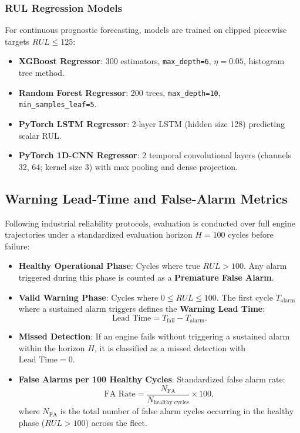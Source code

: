 \subsubsection{RUL Regression Models}
For continuous prognostic forecasting, models are trained on clipped piecewise targets $RUL \le 125$:
\begin{itemize}
    \item \textbf{XGBoost Regressor}: 300 estimators, \texttt{max\_depth=6}, $\eta=0.05$, histogram tree method.
    \item \textbf{Random Forest Regressor}: 200 trees, \texttt{max\_depth=10}, \texttt{min\_samples\_leaf=5}.
    \item \textbf{PyTorch LSTM Regressor}: 2-layer LSTM (hidden size 128) predicting scalar RUL.
    \item \textbf{PyTorch 1D-CNN Regressor}: 2 temporal convolutional layers (channels 32, 64; kernel size 3) with max pooling and dense projection.
\end{itemize}

\subsection{Warning Lead-Time and False-Alarm Metrics}
Following industrial reliability protocols, evaluation is conducted over full engine trajectories under a standardized evaluation horizon $H=100$ cycles before failure:
\begin{itemize}
    \item \textbf{Healthy Operational Phase}: Cycles where true $RUL > 100$. Any alarm triggered during this phase is counted as a \textbf{Premature False Alarm}.
    \item \textbf{Valid Warning Phase}: Cycles where $0 \le RUL \le 100$. The first cycle $T_{\text{alarm}}$ where a sustained alarm triggers defines the \textbf{Warning Lead Time}:
    \begin{equation}
    \text{Lead Time} = T_{\text{fail}} - T_{\text{alarm}}.
    \end{equation}
    \item \textbf{Missed Detection}: If an engine fails without triggering a sustained alarm within the horizon $H$, it is classified as a missed detection with $\text{Lead Time} = 0$.
    \item \textbf{False Alarms per 100 Healthy Cycles}: Standardized false alarm rate:
    \begin{equation}
    \text{FA Rate} = \frac{N_{\text{FA}}}{N_{\text{healthy cycles}}} \times 100,
    \end{equation}
    where $N_{\text{FA}}$ is the total number of false alarm cycles occurring in the healthy phase ($RUL > 100$) across the fleet.
\end{itemize}

